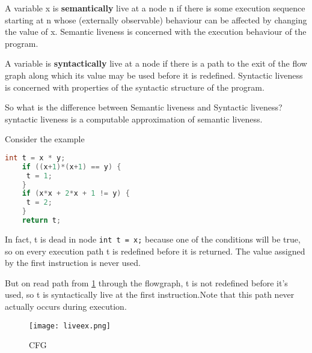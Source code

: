 A variable x is \textbf{semantically} live at a node n if there is
some execution sequence starting at n whose (externally
observable) behaviour can be affected by changing the
value of x. Semantic liveness is concerned with
the execution behaviour of the program.

A variable is \textbf{syntactically} live at a node if there is a
path to the exit of the flow graph along which its
value may be used before it is redefined. Syntactic liveness is concerned with properties of
the syntactic structure of the program.


So what is the difference between Semantic liveness and Syntactic liveness? syntactic liveness
is a computable approximation of semantic liveness.


Consider the example 


\begin{lstlisting}[language=C,frame=single, caption=An ,label = lst:expr2]
    int t = x * y;
    if ((x+1)*(x+1) == y) {
     t = 1;
    }
    if (x*x + 2*x + 1 != y) {
     t = 2;
    }
    return t;
\end{lstlisting}

In fact, t is dead in node \texttt{int t = x;} because one of the conditions will be true, 
so on every execution path t is redefined before it is returned.
The value assigned by the first instruction is never used.


But on read path from \ref{fig:liveex} through the
flowgraph, t is not
redefined before it's used,
so t is syntactically live at
the first instruction.Note that this path never
actually occurs during
execution.

\begin{figure}[h]
    \centering
    \texttt{[image: liveex.png]}
    \caption{CFG}
    \label{fig:liveex}
\end{figure}




